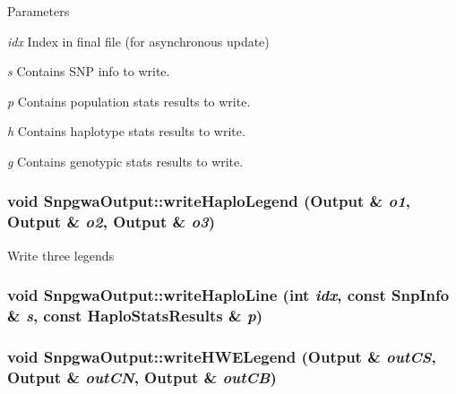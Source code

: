 \begin{DoxyParams}{Parameters}
\item[{\em idx}]Index in final file (for asynchronous update) \item[{\em s}]Contains SNP info to write. \item[{\em p}]Contains population stats results to write. \item[{\em h}]Contains haplotype stats results to write. \item[{\em g}]Contains genotypic stats results to write. \end{DoxyParams}
\hypertarget{classSnpgwaOutput_a0d4bcf07b492d77a4211ed5ed5fe6397}{
\subsubsection[{writeHaploLegend}]{\setlength{\rightskip}{0pt plus 5cm}void SnpgwaOutput::writeHaploLegend ({\bf Output} \& {\em o1}, \/  {\bf Output} \& {\em o2}, \/  {\bf Output} \& {\em o3})}}
\label{classSnpgwaOutput_a0d4bcf07b492d77a4211ed5ed5fe6397}
Write three legends \hypertarget{classSnpgwaOutput_a090565719776955cc321e83d55693205}{
\subsubsection[{writeHaploLine}]{\setlength{\rightskip}{0pt plus 5cm}void SnpgwaOutput::writeHaploLine (int {\em idx}, \/  const {\bf SnpInfo} \& {\em s}, \/  const {\bf HaploStatsResults} \& {\em p})}}
\label{classSnpgwaOutput_a090565719776955cc321e83d55693205}
\hypertarget{classSnpgwaOutput_a2090144186c1c1a6a832c36094661087}{
\subsubsection[{writeHWELegend}]{\setlength{\rightskip}{0pt plus 5cm}void SnpgwaOutput::writeHWELegend ({\bf Output} \& {\em outCS}, \/  {\bf Output} \& {\em outCN}, \/  {\bf Output} \& {\em outCB})}}
